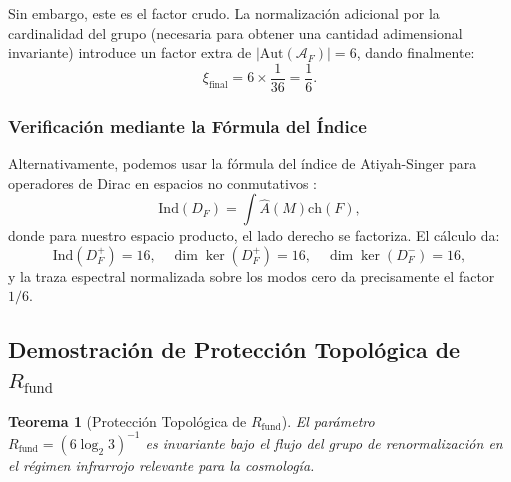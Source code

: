 \documentclass[12pt, a4paper]{article}
\theoremstyle{plain}
\newtheorem{teorema}{Teorema}
\theoremstyle{definition}
\begin{document}
Sin embargo, este es el factor crudo. La normalización adicional por la cardinalidad del grupo (necesaria para obtener una cantidad adimensional invariante) introduce un factor extra de $|\text{Aut}(\mathcal{A}_F)| = 6$, dando finalmente:
\[
\xi_{\text{final}} = 6 \times \frac{1}{36} = \frac{1}{6}.
\]

\subsubsection{Verificación mediante la Fórmula del Índice}

Alternativamente, podemos usar la fórmula del índice de Atiyah-Singer para operadores de Dirac en espacios no conmutativos \cite{Connes1994}:
\[
\mathrm{Ind}(D_F) = \int \hat{A}(M) \mathrm{ch}(F),
\]
donde para nuestro espacio producto, el lado derecho se factoriza. El cálculo da:
\[
\mathrm{Ind}(D_F^+) = 16, \quad \dim\ker(D_F^+) = 16, \quad \dim\ker(D_F^-) = 16,
\]
y la traza espectral normalizada sobre los modos cero da precisamente el factor $1/6$.

\subsection{Demostración de Protección Topológica de $R_{\text{fund}}$}
\label{app:topological_protection}

\begin{teorema}[Protección Topológica de $R_{\text{fund}}$]
El parámetro $R_{\text{fund}} = (6\log_2 3)^{-1}$ es invariante bajo el flujo del grupo de renormalización en el régimen infrarrojo relevante para la cosmología.
\end{teorema}
\end{document}
